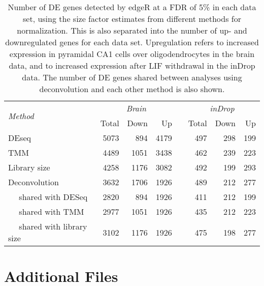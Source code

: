 \documentclass{bmcart}
\begin{document}
\begin{backmatter}
\begin{table}[!h]
\caption{
    Number of DE genes detected by edgeR at a FDR of 5\% in each data set, using the size factor estimates from different methods for normalization.
    This is also separated into the number of up- and downregulated genes for each data set.
    Upregulation refers to increased expression in pyramidal CA1 cells over oligodendrocytes in the brain data, and to increased expression after LIF withdrawal in the inDrop data.
    The number of DE genes shared between analyses using deconvolution and each other method is also shown.
}
\begin{center}
\begin{tabular}{l r r r c r r r}
\hline
\multirow{2}{*}{\textit{Method}} & \multicolumn{3}{c}{\textit{Brain}} && \multicolumn{3}{c}{\textit{inDrop}}  \\
\cline{2-4}
\cline{6-8}
& Total & Down & Up && Total & Down & Up \\
\hline
DEseq                               & 5073 & 894  & 4179 && 497 & 298 & 199 \\
TMM                                 & 4489 & 1051 & 3438 && 462 & 239 & 223 \\
Library size                        & 4258 & 1176 & 3082 && 492 & 199 & 293 \\
Deconvolution                       & 3632 & 1706 & 1926 && 489 & 212 & 277 \\
$\quad$ shared with DESeq           & 2820 & 894  & 1926 && 411 & 212 & 199 \\
$\quad$ shared with TMM             & 2977 & 1051 & 1926 && 435 & 212 & 223 \\
$\quad$ shared with library size    & 3102 & 1176 & 1926 && 475 & 198 & 277 \\
\hline                                                   
\end{tabular}
\end{center}
\label{tab:real_de}
\end{table}


\section*{Additional Files}

\end{backmatter}
\end{document}
